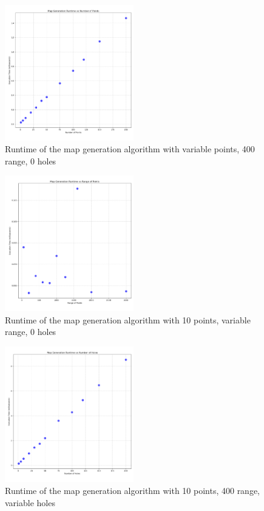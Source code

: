 \documentclass[final]{cmpreport_02}
\begin{document}
\begin{figure}[h!]
	\centering
	\includegraphics[width=0.5\textwidth]{./images/mapGenPointsRT.png}
	\caption{Runtime of the map generation algorithm with variable points, 400 range, 0 holes}
	\label{PE:mg:points}
\end{figure}


\begin{figure}[h!]
	\centering
	\includegraphics[width=0.5\textwidth]{./images/mapGenRangeRT.png}
	\caption{Runtime of the map generation algorithm with 10 points, variable range, 0 holes}
	\label{PE:mg:range}
\end{figure}

\begin{figure}[h!]
	\centering
	\includegraphics[width=0.5\textwidth]{./images/mapGenHolesRT.png}
	\caption{Runtime of the map generation algorithm with 10 points, 400 range, variable holes}
	\label{PE:mg:holes}
\end{figure}
\end{document}
